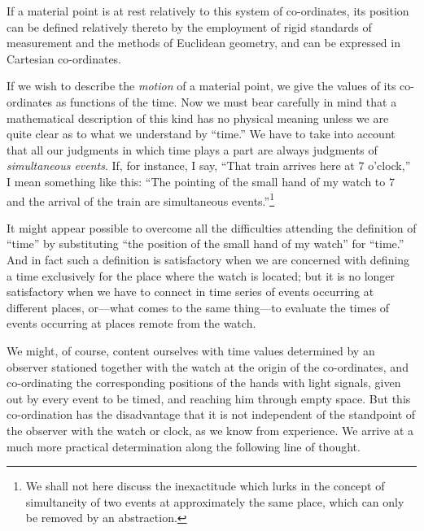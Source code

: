 \documentclass{article}
\begin{document}
If a material point is at rest relatively to this system of
co-ordinates, its position can be defined relatively thereto by the
employment of rigid standards of measurement and the methods of
Euclidean geometry, and can be expressed in Cartesian co-ordinates.

If we wish to describe the {\em motion} of a material point, we give
the values of its co-ordinates as functions of the time.  Now we
must bear carefully in mind that a mathematical description of
this kind has no physical meaning unless we are quite clear as
to what we understand by ``time.'' We have to take into account
that all our judgments in which time plays a part are always
judgments of {\em simultaneous events}.  If, for instance, I say,
``That train arrives here at 7 o'clock,'' I mean something like
this: ``The pointing of the small hand of my watch to 7 and the
arrival of the train are simultaneous events.''\footnote{We shall
not here discuss the inexactitude which lurks in the concept of
simultaneity of two events at approximately the same place,
which can only be removed by an abstraction.}

It might appear possible to overcome all the difficulties attending
the definition of ``time'' by substituting ``the position of the small
hand of my watch'' for ``time.''  And in fact such a definition is
satisfactory when we are concerned with defining a time exclusively
for the place where the watch is located; but it is no longer
satisfactory when we have to connect in time series of events
occurring at different places, or---what comes to the same thing---to
evaluate the times of events occurring at places remote from the
watch.

We might, of course, content ourselves with time values determined by
an observer stationed together with the watch at the origin of the
co-ordinates, and co-ordinating the corresponding positions of the
hands with light signals, given out by every event to be timed, and
reaching him through empty space.  But this co-ordination has the
disadvantage that it is not independent of the standpoint of the
observer with the watch or clock, as we know from experience.  We
arrive at a much more practical determination along the following line
of thought.
\end{document}

